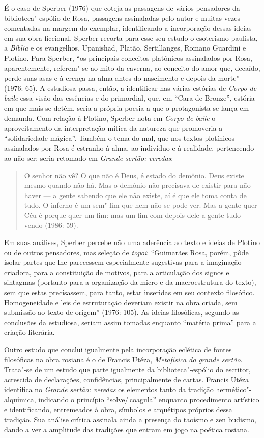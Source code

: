 {É o caso de Sperber (1976) que coteja as passagens de vários
pensadores da biblioteca"-espólio de Rosa, passagens assinaladas pelo
autor e muitas vezes comentadas na margem do exemplar, identificando
a incorporação dessas ideias em sua obra ficcional. Sperber recorta
para esse seu estudo o esoterismo paulista, a \emph{Bíblia} e os
evangelhos, Upanishad, Platão, Sertillanges, Romano Guardini e
Plotino. Para Sperber, “os principais conceitos platônicos
assinalados por Rosa, aparentemente, referem"-se ao mito da caverna,
ao conceito do amor que, decaído, perde suas asas e à crença na alma
antes do nascimento e depois da morte” (1976: 65). A estudiosa passa,
então, a identificar nas várias estórias de \emph{Corpo de baile}
essa visão das essências e do primordial, que, em “Cara de Bronze”,
estória em que mais se detém, seria a própria poesia a que o
protagonista se lança em demanda. Com relação à Plotino, Sperber nota
em \emph{Corpo de baile} o aproveitamento da interpretação mítica
da natureza que promoveria a “solidariedade mágica”. Também o tema do
mal, que nos textos plotínicos assinalados por Rosa é estranho à
alma, ao indivíduo e à realidade, pertencendo ao não ser; seria
retomado em \emph{Grande sertão: veredas}:

\begin{quote}
O senhor não vê? O que não é Deus, é estado do demônio. Deus existe
mesmo quando não há. Mas o demônio não precisava de existir para não
haver --- a gente sabendo que ele não existe, aí é que ele toma conta
de tudo. O inferno é um sem"-fim que nem não se pode ver. Mas a gente
quer Céu é porque quer um fim: mas um fim com depois dele a gente
tudo vendo (1986: 59).
\end{quote}

Em suas análises, Sperber percebe não uma aderência ao texto e ideias
de Plotino ou de outros pensadores, mas seleção de \emph{topoi}:
“Guimarães Rosa, porém, pôde isolar partes que lhe parecessem
especialmente sugestivas para a imaginação criadora, para a
constituição de motivos, para a articulação dos signos e sintagmas
(portanto para a organização da micro e da macroestrutura do texto),
sem que estas precisassem, para tanto, estar inseridas em seu
contexto filosófico. Homogeneidade e leis de estruturação deveriam
existir na obra criada, sem submissão ao texto de origem” (1976:
105). As ideias filosóficas, segundo as conclusões da estudiosa,
seriam assim tomadas enquanto “matéria prima” para a criação
literária.

Outro estudo que conclui igualmente pela incorporação eclética de
fontes filosóficas na obra rosiana é o de Francis Utéza,
\emph{Metafísica do grande sertão}. Trata"-se de um estudo que parte
igualmente da biblioteca"-espólio do escritor, acrescida de
declarações, confidências, principalmente de cartas. Francis Utéza
identifica no \emph{Grande sertão: veredas} os elementos tanto da
tradição hermético"-alquímica, indicando o princípio “solve/\,coagula”
enquanto procedimento artístico e identificando, entremeados à obra,
símbolos e arquétipos próprios dessa tradição. Sua análise crítica
assinala ainda a presença do taoísmo e zen budismo, dando a ver a
amplitude das tradições que entram em jogo na poética rosiana.

}
